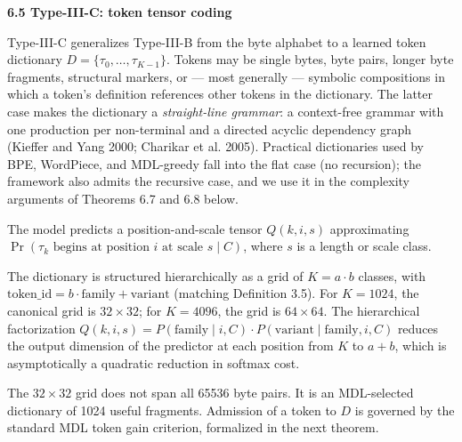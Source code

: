 \documentclass[
]{article}
\begin{document}
\textbf{6.5 Type-III-C: token tensor coding}

Type-III-C generalizes Type-III-B from the byte alphabet to a learned
token dictionary $D = \{\tau_0, \ldots, \tau_{K-1}\}$. Tokens may be
single bytes, byte pairs, longer byte fragments, structural markers,
or --- most generally --- symbolic compositions in which a token's
definition references other tokens in the dictionary. The latter case
makes the dictionary a \emph{straight-line grammar}: a context-free
grammar with one production per non-terminal and a directed acyclic
dependency graph (Kieffer and Yang 2000; Charikar et al. 2005).
Practical dictionaries used by BPE, WordPiece, and MDL-greedy fall
into the flat case (no recursion); the framework also admits the
recursive case, and we use it in the complexity arguments of Theorems
6.7 and 6.8 below.

The model predicts a position-and-scale tensor $Q(k, i, s)$
approximating $\Pr(\tau_k \text{ begins at position } i \text{ at
scale } s \mid C)$, where $s$ is a length or scale class.

The dictionary is structured hierarchically as a grid of $K = a \cdot
b$ classes, with $\text{token\_id} = b \cdot \text{family} +
\text{variant}$ (matching Definition 3.5). For $K = 1024$, the canonical grid is
$32 \times 32$; for $K = 4096$, the grid is $64 \times 64$. The
hierarchical factorization
$Q(k, i, s) = P(\text{family} \mid i, C) \cdot
P(\text{variant} \mid \text{family}, i, C)$
reduces the output dimension of the predictor at each position from
$K$ to $a + b$, which is asymptotically a quadratic reduction in
softmax cost.

The $32 \times 32$ grid does not span all 65536 byte pairs. It is an
MDL-selected dictionary of 1024 useful fragments. Admission of a token
to $D$ is governed by the standard MDL token gain criterion,
formalized in the next theorem.
\end{document}
